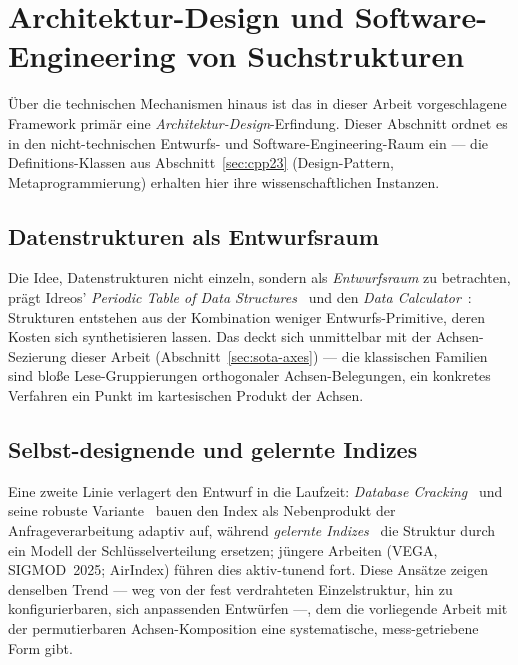 \section{Architektur-Design und Software-Engineering von Suchstrukturen}\label{sec:sota-design}
Über die technischen Mechanismen hinaus ist das in dieser Arbeit vorgeschlagene Framework primär
eine \emph{Architektur-Design}-Erfindung. Dieser Abschnitt ordnet es in den nicht-technischen
Entwurfs- und Software-Engineering-Raum ein --- die Definitions-Klassen aus
Abschnitt~\ref{sec:cpp23} (Design-Pattern, Metaprogrammierung) erhalten hier ihre wissenschaftlichen
Instanzen.

\subsection{Datenstrukturen als Entwurfsraum}\label{ssec:sota-design-space}
Die Idee, Datenstrukturen nicht einzeln, sondern als \emph{Entwurfsraum} zu betrachten, prägt
Idreos' \emph{Periodic Table of Data Structures}~\cite{idreos2018periodic} und den
\emph{Data Calculator}~\cite{idreos2018datacalculator}: Strukturen entstehen aus der Kombination
weniger Entwurfs-Primitive, deren Kosten sich synthetisieren lassen. Das deckt sich unmittelbar mit
der Achsen-Sezierung dieser Arbeit (Abschnitt~\ref{sec:sota-axes}) --- die klassischen Familien sind
bloße Lese-Gruppierungen orthogonaler Achsen-Belegungen, ein konkretes Verfahren ein Punkt im
kartesischen Produkt der Achsen.

\subsection{Selbst-designende und gelernte Indizes}\label{ssec:sota-design-selftuning}
Eine zweite Linie verlagert den Entwurf in die Laufzeit:
\emph{Database Cracking}~\cite{idreos2007cracking} und seine robuste
Variante~\cite{halim2012stochastic} bauen den Index als Nebenprodukt der Anfrageverarbeitung adaptiv
auf, während \emph{gelernte Indizes}~\cite{kraska2018learned} die Struktur durch ein Modell der
Schlüsselverteilung ersetzen; jüngere Arbeiten (VEGA, SIGMOD~2025; AirIndex) führen dies
aktiv-tunend fort. Diese Ansätze zeigen denselben Trend --- weg von der fest verdrahteten
Einzelstruktur, hin zu konfigurierbaren, sich anpassenden Entwürfen ---, dem die vorliegende Arbeit
mit der permutierbaren Achsen-Komposition eine systematische, mess-getriebene Form gibt.

